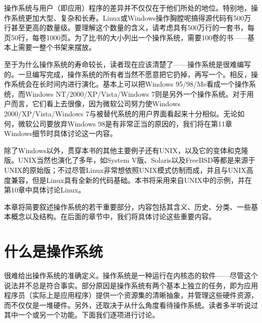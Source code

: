 \par 操作系统与用户（即应用）程序的差异并不仅仅在于他们所处的地位。特别地，操作系统更加大型、复杂和长寿。Linux或Windows操作胸膛呢搞得源代码有500万行甚至更高的数量级。要理解这个数量的含义，请考虑具有500万行的一套书，每页50行，每卷1000页。为了比书的大小列出一个操作系统，需要100卷的书——基本上需要一整个书架来摆放。
\par 至于为什么操作系统的寿命较长，读者现在应该清楚了——操作系统是很难编写的。一旦编写完成，操作系统的所有者当然不愿意把它扔掉，再写一个。相反，操作系统会在长时间内进行演化。基本上可以把Windows 95/98/Me看成一个操作系统，而Windows NT/2000/XP/Vista/Windows 7则是另外一个操作系统。对于用户而言，它们看上去很像，因为微软公司努力使Windows 2000/XP/Vista/Windows 7与被替代系统的用户界面看起来十分相似。无论如何，微软公司要放弃Windows 98是有非常正当的原因的，我们将在第11章Windows细节时具体讨论这一内容。
\par 除了Windows以外，贯穿本书的其他主要例子还有UNIX，以及它的变体和克隆版。UNIX当然也演化了多年，如System V版、Solaris以及FreeBSD等都是来源于UNIX的原始版；不过尽管Linux非常想依照UNIX模式仿制而成，并且与UNIX高度兼容，但是Linux具有全新的代码基础。本书将采用来自UNIX中的示例，并在第10章中具体讨论Linux。
\par 本章将简要叙述操作系统的若干重要部分，内容包括其含义、历史、分类、一些基本概念以及结构。在后面的章节中，我们将具体讨论这些重要内容。
\section{什么是操作系统}
很难给出操作系统的准确定义。操作系统是一种运行在内核态的软件——尽管这个说法并不总是符合事实。部分原因是操作系统有两个基本上独立的任务，即为应用程序员（实际上是应用程序）提供一个资源集的清晰抽象，并管理这些硬件资源，而不仅仅是一堆硬件。另外，还取决于从什么角度看待操作系统。读者多半听说过其中一个或另一个功能。下面我们逐项进行讨论。
